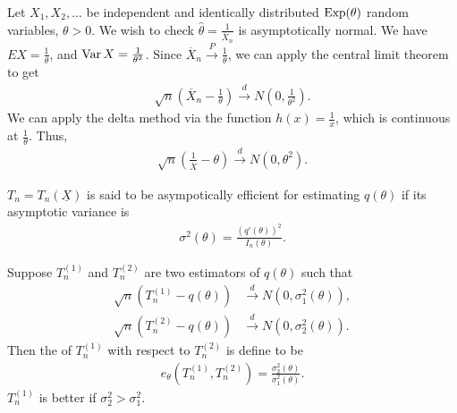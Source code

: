 \begin{example}
    Let $X_{1},X_{2},\ldots$ be independent and identically distributed $\operatorname{Exp}(\theta)$ random variables, $\theta > 0$. We wish to check $\hat{\theta} = \frac{1}{\overline{X}_{n}}$ is asymptotically normal. We have $EX = \frac{1}{\theta}$, and $\operatorname{Var} X = \frac{1}{\theta^{2}}$. Since $\overline{X}_{n} \xrightarrow{P} \frac{1}{\theta}$, we can apply the central limit theorem to get
    \begin{align}
        \sqrt{n}(\overline{X}_{n} - \frac{1}{\theta}) \xrightarrow{d} N(0,\frac{1}{\theta^{2}}).
    \end{align}
    We can apply the delta method via the function $h(x) = \frac{1}{x}$, which is continuous at $\frac{1}{\theta}$. Thus,
    \begin{align}
        \sqrt{n}(\frac{1}{\overline{X}}-\theta) \xrightarrow{d} N(0,\theta^{2}).
    \end{align}
\end{example}

$T_{n} = T_{n}(\underline{X})$ is said to be asympotically efficient for estimating $q(\theta)$ if its asymptotic variance is
\begin{align}
    \sigma^{2}(\theta) = \frac{(q'(\theta))^{2}}{I_{n}(\theta)}.
\end{align}

\begin{definition}
    Suppose $T_{n}^{(1)}$ and $T_{n}^{(2)}$ are two estimators of $q(\theta)$ such that
    \begin{align}
        \sqrt{n}(T_{n}^{(1)} - q(\theta)) &\xrightarrow{d} N (0,\sigma_{1}^{2}(\theta)),\\
        \sqrt{n}(T_{n}^{(2)} - q(\theta)) &\xrightarrow{d} N(0,\sigma_{2}^{2}(\theta)).
    \end{align}
    Then the  of $T_{n}^{(1)}$ with respect to $T_{n}^{(2)}$ is define to be \begin{align}
        e_{\theta}(T_{n}^{(1)},T_{n}^{(2)}) = \frac{\sigma_{2}^{2}(\theta)}{\sigma_{1}^{2}(\theta)}.
    \end{align}
    $T_{n}^{(1)}$ is better if $\sigma_{2}^{2} > \sigma_{1}^{2}$.
\end{definition}

